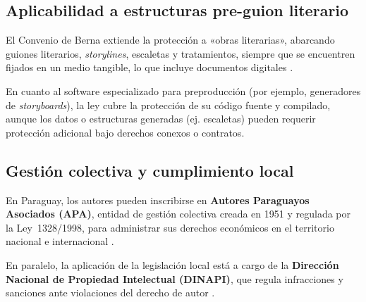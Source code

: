 \documentclass[12pt]{article}
\begin{document}
	\subsection{Aplicabilidad a estructuras pre-guion literario}

	El Convenio de Berna extiende la protección a «obras literarias», abarcando guiones literarios, \textit{storylines}, escaletas y tratamientos, siempre que se encuentren fijados en un medio tangible, lo que incluye documentos digitales \parencite{berne2025}.

	En cuanto al software especializado para preproducción (por ejemplo, generadores de \textit{storyboards}), la ley cubre la protección de su código fuente y compilado, aunque los datos o estructuras generadas (ej. escaletas) pueden requerir protección adicional bajo derechos conexos o contratos.

	\subsection{Gestión colectiva y cumplimiento local}

	En Paraguay, los autores pueden inscribirse en \textbf{Autores Paraguayos Asociados (APA)}, entidad de gestión colectiva creada en 1951 y regulada por la Ley 1328/1998, para administrar sus derechos económicos en el territorio nacional e internacional \parencite{apa_py}.

	En paralelo, la aplicación de la legislación local está a cargo de la \textbf{Dirección Nacional de Propiedad Intelectual (DINAPI)}, que regula infracciones y sanciones ante violaciones del derecho de autor \parencite{ip_office_py}.


	\printbibliography
\end{document}
